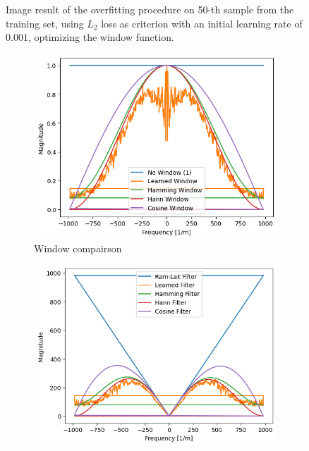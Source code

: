 \documentclass[12pt,a4paper]{article}
\begin{document}
\begin{figure}[h!]
    \caption{Image result of the overfitting procedure on 50-th sample from the training set, using $L_2$ loss as criterion with an initial learning rate of $0.001$, optimizing the window function.}
    \label{fig:windowII+l2+slow50_images} %
\end{figure}

\begin{figure}
    \centering
    \begin{subfigure}[t]{0.49\textwidth}
        \centering
        \includegraphics[width=\textwidth]{Bachelorthesis//UsedImages/exp1_window_function.png}
        \caption{Window compairson}
        \label{fig:windowII+l2+slow50_windows}
    \end{subfigure}
    \hfill
    \begin{subfigure}[t]{0.49\textwidth}
        \centering
        \includegraphics[width=\textwidth]{Bachelorthesis//UsedImages/exp1_filters.png}

\end{subfigure}
\end{figure}
\end{document}
